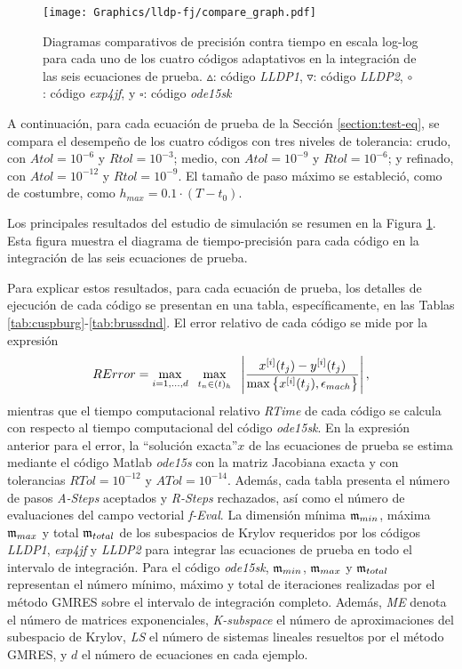 \begin{figure}
	\begin{center}
		\hspace{-0.75in}
		\texttt{[image: Graphics/lldp-fj/compare\_graph.pdf]}
		\vspace{-0.95in}
		\caption{Diagramas comparativos de precisión contra tiempo en escala log-log para cada uno de los cuatro códigos adaptativos en la integración de las seis ecuaciones de prueba. $\vartriangle$: código \emph{LLDP1}, $\triangledown$: código \emph{LLDP2}, $\circ$ : código \emph{exp4jf}, y $\square$: código \emph{ode15sk}}
		\label{lldpfj:Fig1}
	\end{center}
\end{figure}

A continuación, para cada ecuación de prueba de la Sección \ref{section:test-eq}, se compara el desempeño de los cuatro códigos con tres niveles de tolerancia: crudo, con $ Atol = 10^{-6}$ y $Rtol = 10^{-3}$; medio, con $Atol = 10^{-9}$ y $Rtol = 10^{-6}$; y refinado, con $ Atol = 10^{-12}$ y $Rtol = 10^{-9}$. El tamaño de paso máximo se estableció, como de costumbre, como $h_{max}=0\mathord{.}1\cdot(T-t_0)$.

Los principales resultados del estudio de simulación se resumen en la Figura \ref{lldpfj:Fig1}. Esta figura muestra el diagrama de tiempo-precisión para cada código en la integración de las seis ecuaciones de prueba.

Para explicar estos resultados, para cada ecuación de prueba, los detalles de ejecución de cada código se presentan en una tabla, específicamente, en las Tablas \ref{tab:cuspburg}-\ref{tab:brussdnd}. El error relativo de cada código se mide por la expresión
\begin{equation*}
	RError = \max_{i=1,\ldots,d} \;\ \max_{t_n\in(t)_h}  \;\ \left\lvert\frac{x^{[i]}(t_j)-y^{[i]}(t_j)}{\maxx{x^{[i]}(t_j),\epsilon_{mach}}}\right\rvert,
\end{equation*}
mientras que el tiempo computacional relativo \textit{RTime} de cada código se calcula con respecto al tiempo computacional del código \emph{ode15sk}. En la expresión anterior para el error, la \textquotedblleft solución exacta\textquotedblright \;$x$ de las ecuaciones de prueba se estima mediante el código Matlab \emph{ode15s} con la matriz Jacobiana exacta y con tolerancias $RTol=10^{-12}$ y $ATol=10^{-14}$. Además, cada tabla presenta el número de pasos \textit{A-Steps} aceptados y \textit{R-Steps} rechazados, así como el número de evaluaciones del campo vectorial \textit{f-Eval}. La dimensión mínima $\mathfrak{m}_ {min}$, máxima $\mathfrak{m}_ {max}$ y total $\mathfrak{m}_{total}$ de los subespacios de Krylov requeridos por los códigos \emph{LLDP1}, \emph{exp4jf} y \emph{LLDP2} para integrar las ecuaciones de prueba en todo el intervalo de integración. Para el código \emph{ode15sk}, $\mathfrak{m}_{min}$, $\mathfrak{m}_{max}$ y $\mathfrak{m}_{total}$ representan el número mínimo, máximo y total de iteraciones realizadas por el método GMRES sobre el intervalo de integración completo. Además, \textit{ME} denota el número de matrices exponenciales, \textit{K-subspace} el número de aproximaciones del subespacio de Krylov, \textit{LS} el número de sistemas lineales resueltos por el método GMRES, y $d$ el número de ecuaciones en cada ejemplo.

